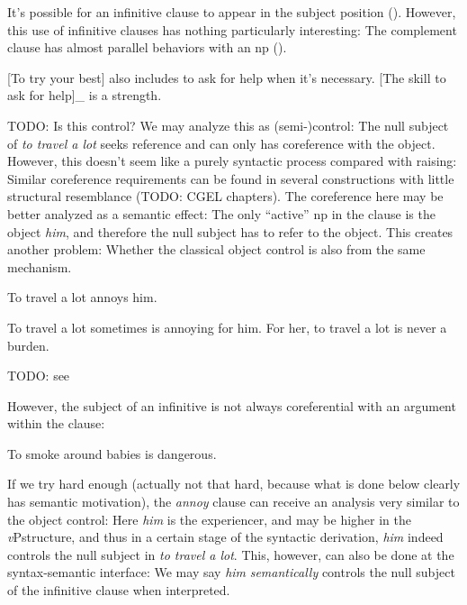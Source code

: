 \documentclass[UTF8, a4paper, oneside, scheme=plain, 12pt]{ctexbook}
\newcommand*{\citepage}[1]{p.~{#1}}
\newcommand{\form}[1]{\emph{#1}}
\newcommand{\vP}{\textit{v}P}
\begin{document}
It's possible for an infinitive clause to appear in the subject position
().
However, this use of infinitive clauses 
has nothing particularly interesting:
The complement clause has almost parallel behaviors with an \acs{np} 
().

\begin{exe}
    \ex\label{ex:complement.infinitive.1} 
    [To try your best] also includes to ask for help when it's necessary.
    \ex\label{ex:complement.infinitive.1p} [The skill to ask for help]_{}
    is a strength.
\end{exe}

TODO: Is this control?
We may analyze this as (semi-)control:
The null subject of \form{to travel a lot} 
seeks reference and can only has coreference with the object.
However, this doesn't seem like a purely syntactic process
compared with raising:
Similar coreference requirements can be found in 
several constructions with little structural resemblance
(TODO: CGEL chapters).
The coreference here may be better analyzed as a semantic effect:
The only ``active'' \acs{np} in the clause is the object \form{him},
and therefore the null subject has to refer to the object.
This creates another problem: 
Whether the classical object control is also from the same mechanism.

\begin{exe}
    \ex To travel a lot annoys him.
\end{exe}
\begin{exe}
    \ex To travel a lot sometimes is annoying for him.
    \ex For her, to travel a lot is never a burden.
\end{exe}

TODO: see \citet[\citepage{1269}]{cgel}

However, the subject of an infinitive is not always coreferential with an argument within the clause:
\begin{exe}
    \ex To smoke around babies is dangerous.
\end{exe} 

If we try hard enough
(actually not that hard, because what is done below clearly has semantic motivation), 
the \form{annoy} clause can receive an analysis very similar to the object control:
Here \form{him} is the experiencer, 
and may be higher in the \vP structure, 
and thus in a certain stage of the syntactic derivation,
\form{him} indeed controls the null subject in \form{to travel a lot}.
This, however, can also be done at the syntax-semantic interface: 
We may say \form{him} \emph{semantically} controls 
the null subject of the infinitive clause
when interpreted.
\end{document}
